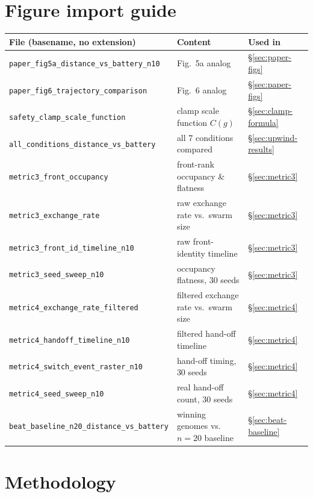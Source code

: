 \documentclass[11pt]{article}
\begin{document}
\section*{Figure import guide}
\begin{center}
\begin{tabular}{@{}lll@{}}
\toprule
\textbf{File (basename, no extension)} & \textbf{Content} & \textbf{Used in} \\
\midrule
\texttt{paper\_fig5a\_distance\_vs\_battery\_n10} & Fig.~5a analog & \S\ref{sec:paper-figs} \\
\texttt{paper\_fig6\_trajectory\_comparison} & Fig.~6 analog & \S\ref{sec:paper-figs} \\
\texttt{safety\_clamp\_scale\_function} & clamp scale function $C(g)$ & \S\ref{sec:clamp-formula} \\
\texttt{all\_conditions\_distance\_vs\_battery} & all 7 conditions compared & \S\ref{sec:upwind-results} \\
\texttt{metric3\_front\_occupancy} & front-rank occupancy \& flatness & \S\ref{sec:metric3} \\
\texttt{metric3\_exchange\_rate} & raw exchange rate vs.\ swarm size & \S\ref{sec:metric3} \\
\texttt{metric3\_front\_id\_timeline\_n10} & raw front-identity timeline & \S\ref{sec:metric3} \\
\texttt{metric3\_seed\_sweep\_n10} & occupancy flatness, 30 seeds & \S\ref{sec:metric3} \\
\texttt{metric4\_exchange\_rate\_filtered} & filtered exchange rate vs.\ swarm size & \S\ref{sec:metric4} \\
\texttt{metric4\_handoff\_timeline\_n10} & filtered hand-off timeline & \S\ref{sec:metric4} \\
\texttt{metric4\_switch\_event\_raster\_n10} & hand-off timing, 30 seeds & \S\ref{sec:metric4} \\
\texttt{metric4\_seed\_sweep\_n10} & real hand-off count, 30 seeds & \S\ref{sec:metric4} \\
\texttt{beat\_baseline\_n20\_distance\_vs\_battery} & winning genomes vs.\ $n{=}20$ baseline & \S\ref{sec:beat-baseline} \\
\bottomrule
\end{tabular}
\end{center}

\section{Methodology}
\end{document}
